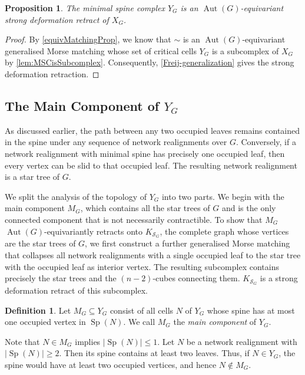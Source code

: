 \documentclass[reqno,dvipsnames]{amsart}
\theoremstyle{plain}
\newtheorem{proposition}[theorem]{Proposition}
\numberwithin{equation}{section}
\theoremstyle{definition}
\newtheorem{definition}[theorem]{Definition}
\DeclareMathOperator{\Sp}{Sp}
\DeclareMathOperator{\Aut}{Aut}
\begin{document}
\begin{proposition}\label{Y_G-matching-thm}
	The minimal spine complex $Y_G$ is an $\Aut(G)$-equivariant strong deformation retract of $X_G$.
\end{proposition}

\begin{proof}
	By \autoref{equivMatchingProp}, we know that $\sim$ is an $\Aut(G)$-equivariant generalised Morse matching whose set of critical cells $Y_G$ is a subcomplex of $X_G$ by \autoref{lem:MSCisSubcomplex}. Consequently, \autoref{Freij-generalization} gives the strong deformation retraction.
\end{proof}


\subsection{The Main Component of \texorpdfstring{$Y_G$}{Y_G}}\label{sec:MainCpt}

As discussed earlier, the path between any two occupied leaves remains contained in the spine under any sequence of network realignments over $G$. Conversely, if a network realignment with minimal spine has precisely one occupied leaf, then every vertex can be slid to that occupied leaf. The resulting network realignment is a star tree of $G$. 

We split the analysis of the topology of $Y_G$ into two parts. We begin with the main component $M_G$, which contains all the star trees of $G$ and is the only connected component that is not necessarily contractible. To show that $M_G$ $\Aut(G)$-equivariantly retracts onto $K_{\mathcal{S}_G}$, the complete graph whose vertices are the star trees of $G$, we first construct a further generalised Morse matching that collapses all network realignments with a single occupied leaf to the star tree with the occupied leaf as interior vertex. The resulting subcomplex contains precisely the star trees and the $(n-2)$-cubes connecting them. $K_{\mathcal{S}_G}$ is a strong deformation retract of this subcomplex.

\begin{definition}
	Let $M_G\subseteq Y_G$ consist of all cells $N$ of $Y_G$ whose spine has at most one occupied vertex in $\Sp(N)$. We call $M_G$ the \textit{main component} of $Y_G$.
\end{definition}

Note that $N\in M_G$ implies $|\Sp(N)|\leq 1$. Let $N$ be a network realignment with $|\Sp(N)|\geq 2$. Then its spine contains at least two leaves. Thus, if $N\in Y_G$, the spine would have at least two occupied vertices, and hence $N\notin M_G$.
\end{document}
